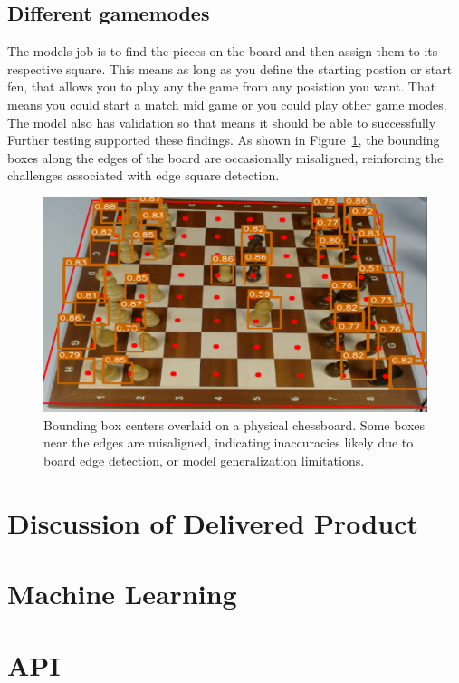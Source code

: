 \subsection{Different gamemodes}

The models job is to find the pieces on the board and then assign them to its respective square. This means as long as you define the starting postion or start fen, that allows you to play any the game from any posistion you want. That means you could start a match mid game or you could play other game modes. The model also has validation so that means it should be able to successfully \\

Further testing supported these findings. As shown in Figure~\ref{fig:bbox-centers-incorrect}, the bounding boxes along the edges of the board are occasionally misaligned, reinforcing the challenges associated with edge square detection.

\begin{figure}[h!]
    \centering
    \includegraphics[width=0.75\linewidth]{figures/discussion/bbox-centers-incorrect.png}
    \caption{Bounding box centers overlaid on a physical chessboard. Some boxes near the edges are misaligned, indicating inaccuracies likely due to board edge detection, or model generalization limitations.}
    \label{fig:bbox-centers-incorrect}
\end{figure}

\section{Discussion of Delivered Product}

\section{Machine Learning}

\section{API}

